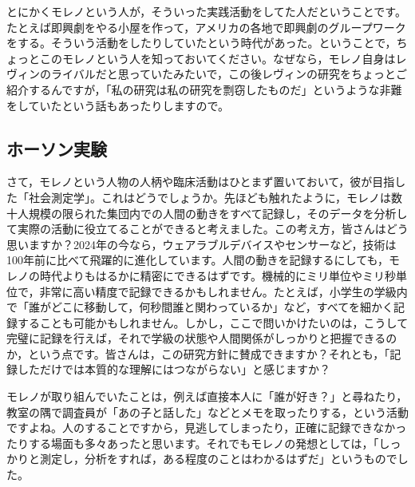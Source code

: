 \documentclass{ltjsbook}
\begin{document}
とにかくモレノという人が，そういった実践活動をしてた人だということです。たとえば即興劇をやる小屋を作って，アメリカの各地で即興劇のグループワークをする。そういう活動をしたりしていたという時代があった。ということで，ちょっとこのモレノという人を知っておいてください。なぜなら，モレノ自身はレヴィンのライバルだと思っていたみたいで，この後レヴィンの研究をちょっとご紹介するんですが，「私の研究は私の研究を剽窃したものだ」というような非難をしていたという話もあったりしますので。

\subsection{ホーソン実験}

さて，モレノという人物の人柄や臨床活動はひとまず置いておいて，彼が目指した「社会測定学」。これはどうでしょうか。先ほども触れたように，モレノは数十人規模の限られた集団内での人間の動きをすべて記録し，そのデータを分析して実際の活動に役立てることができると考えました。この考え方，皆さんはどう思いますか？2024年の今なら，ウェアラブルデバイスやセンサーなど，技術は100年前に比べて飛躍的に進化しています。人間の動きを記録するにしても，モレノの時代よりもはるかに精密にできるはずです。機械的にミリ単位やミリ秒単位で，非常に高い精度で記録できるかもしれません。たとえば，小学生の学級内で「誰がどこに移動して，何秒間誰と関わっているか」など，すべてを細かく記録することも可能かもしれません。しかし，ここで問いかけたいのは，こうして完璧に記録を行えば，それで学級の状態や人間関係がしっかりと把握できるのか，という点です。皆さんは，この研究方針に賛成できますか？それとも，「記録しただけでは本質的な理解にはつながらない」と感じますか？

モレノが取り組んでいたことは，例えば直接本人に「誰が好き？」と尋ねたり，教室の隅で調査員が「あの子と話した」などとメモを取ったりする，という活動ですよね。人のすることですから，見逃してしまったり，正確に記録できなかったりする場面も多々あったと思います。それでもモレノの発想としては，「しっかりと測定し，分析をすれば，ある程度のことはわかるはずだ」というものでした。
\end{document}
